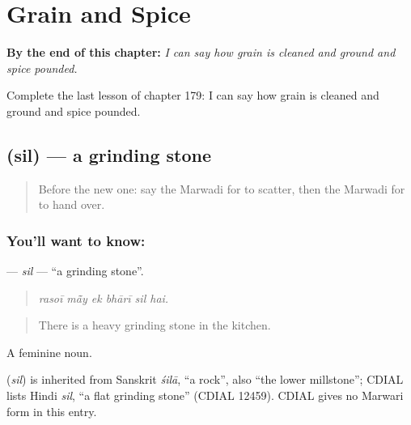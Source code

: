 
\chapter{Grain and Spice}
\label{ch:mw-grain-and-spice}

\begin{chapteropening}
\textbf{By the end of this chapter:} \emph{I can say how grain is cleaned and ground and spice pounded.}

Complete the last lesson of chapter 179: I can say how grain is cleaned and ground and spice pounded.
\end{chapteropening}

\section[\texorpdfstring{\mw{सिल} (sil)}{सिल (sil)}]{ (sil) — a grinding stone}

\label{lesson:MW-C179-sil}



\begin{quote}
Before the new one: say the Marwadi for to scatter, then the Marwadi for to hand over.
\end{quote}

\subsection*{You'll want to know: }
\textbf{} — \emph{sil} — \textquotedblleft{}a grinding stone\textquotedblright{}.

\begin{quote}
     
\end{quote}

\begin{quote}
\emph{rasoī mā̃y ek bhārī sil hai.}
\end{quote}

\begin{quote}
There is a heavy grinding stone in the kitchen.
\end{quote}

A feminine noun.

\begin{cousinweb}
\textbf{} (\emph{sil}) is inherited from Sanskrit \emph{śilā}, \textquotedblleft{}a rock\textquotedblright{}, also \textquotedblleft{}the lower millstone\textquotedblright{}; CDIAL lists Hindi \emph{sil}, \textquotedblleft{}a flat grinding stone\textquotedblright{} (CDIAL 12459). CDIAL gives no Marwari form in this entry.
\end{cousinweb}

